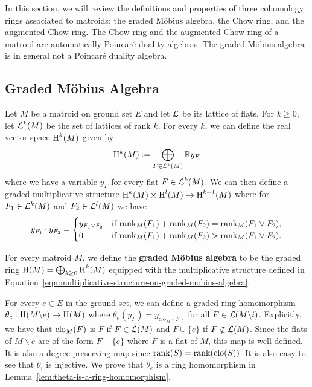 \documentclass{puthesis-UG}
\begin{document}
In this section, we will review the definitions and properties of three cohomology rings associated to matroids: the graded M\"obius algebra, the Chow ring, and the augmented Chow ring. The Chow ring and the augmented Chow ring of a matroid are automatically Poincar\'e duality algebras. The graded M\"obius algebra is in general not a Poincar\'e duality algebra. 

\subsection{Graded M\"obius Algebra}

Let $M$ be a matroid on ground set $E$ and let $\mathcal{L}$ be its lattice of flats. For $k \geq 0$, let $\mathcal{L}^k(M)$ be the set of lattices of rank $k$. For every $k$, we can define the real vector space $\operatorname{H}^k(M)$ given by 
\[
	\operatorname{H}^k(M) := \bigoplus_{F \in \mathcal{L}^k(M)} \mathbb{R} y_F
\]
where we have a variable $y_F$ for every flat $F \in \mathcal{L}^k(M)$. We can then define a graded multiplicative structure $\operatorname{H}^k(M) \times \operatorname{H}^l(M) \to \operatorname{H}^{k+1}(M)$ where for $F_1 \in \mathcal{L}^k(M)$ and $F_2 \in \mathcal{L}^l(M)$ we have 
\begin{equation}\label{eqn:multiplicative-structure-on-graded-mobius-algebra}
	y_{F_1} \cdot y_{F_2} = 
	\begin{cases}
		y_{F_1 \vee F_2} & \text{if $\operatorname{rank}_M(F_1) + \operatorname{rank}_M(F_2) = \operatorname{rank}_M(F_1 \vee F_2)$}, \\
		0 & \text{if $\operatorname{rank}_M(F_1) + \operatorname{rank}_M(F_2) > \operatorname{rank}_M(F_1 \vee F_2)$}.
	\end{cases} 
\end{equation}
\begin{defn}
	For every matroid $M$, we define the \textbf{graded M\"obius algebra} to be the graded ring $\operatorname{H}(M) = \bigoplus_{k \geq 0} \operatorname{H}^k(M)$ equipped with the multiplicative structure defined in Equation~\ref{eqn:multiplicative-structure-on-graded-mobius-algebra}. 
\end{defn}
For every $e \in E$ in the ground set, we can define a graded ring homomorphism $\theta_e : \operatorname{H}(M \backslash e) \to \operatorname{H}(M)$ where $\theta_e (y_F) = y_{\text{clo}_M(F)}$ for all $F \in \mathcal{L}(M \backslash i)$. Explicitly, we have that $\operatorname{clo}_M(F)$ is $F$ if $F \in \mathcal{L}(M)$ and $F \cup \{e\}$ if $F \notin \mathcal{L}(M)$. Since the flats of $M \backslash e$ are of the form $F - \{e\}$ where $F$ is a flat of $M$, this map is well-defined. It is also a degree preserving map since $\operatorname{rank} (S) = \operatorname{rank} (\operatorname{clo}(S))$. It is also easy to see that $\theta_i$ is injective. We prove that $\theta_e$ is a ring homomorphism in Lemma~\ref{lem:theta-is-a-ring-homomorphism}. 
\end{document}

